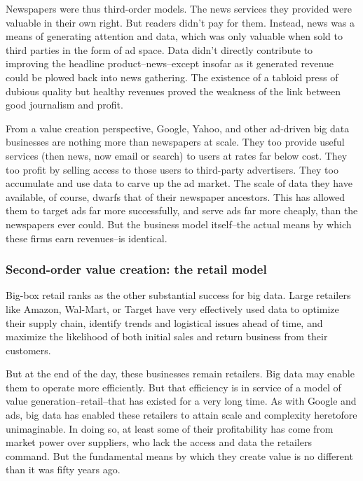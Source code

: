 \documentclass[12pt]{article}
\begin{document}
Newspapers were thus third-order models. The news services they
provided were valuable in their own right. But readers didn't pay for
them. Instead, news was a means of generating attention and data,
which was only valuable when sold to third parties in the form of ad
space. Data didn't directly contribute to improving the headline
product--news--except insofar as it generated revenue could be plowed
back into news gathering. The existence of a tabloid press of dubious
quality but healthy revenues proved the weakness of the link between
good journalism and profit.

From a value creation perspective, Google, Yahoo, and other ad-driven
big data businesses are nothing more than newspapers at scale. They
too provide useful services (then news, now email or search) to users
at rates far below cost. They too profit by selling access to those
users to third-party advertisers. They too accumulate and use data to
carve up the ad market. The scale of data they have available, of
course, dwarfs that of their newspaper ancestors. This has allowed
them to target ads far more successfully, and serve ads far more
cheaply, than the newspapers ever could. But the business model
itself--the actual means by which these firms earn revenues--is
identical. 

\subsubsection{Second-order value creation: the retail model}
\label{sec:second-order-value}


Big-box retail ranks as the other substantial success for big
data. Large retailers like Amazon, Wal-Mart, or Target have very
effectively used data to optimize their supply chain, identify trends
and logistical issues ahead of time, and maximize the likelihood of
both initial sales and return business from their customers. 

But at the end of the day, these businesses remain retailers. Big data
may enable them to operate more efficiently. But that efficiency is in
service of a model of value generation--retail--that has existed for a
very long time. As with Google and ads, big data has enabled these
retailers to attain scale and complexity heretofore unimaginable. In
doing so, at least some of their profitability has come from market
power over suppliers, who lack the access and data the retailers
command. But the fundamental means by which they create value is no
different than it was fifty years ago.
\end{document}
